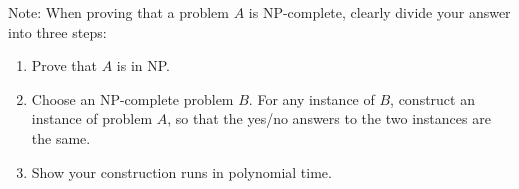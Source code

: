 \noindent 
Note: When proving that a problem $A$ is NP-complete, clearly divide your answer into three steps:
\begin{enumerate}
\item Prove that $A$ is in NP.
\item Choose an NP-complete problem $B$. For any instance of $B$, construct an instance of problem $A$, so that the yes/no answers to the two instances are the same.
\item Show your construction runs in polynomial time.
\end{enumerate}
\newpage